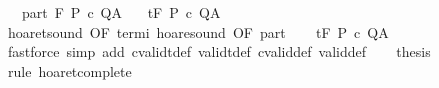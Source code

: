 \begin{isabellebody}
\ \ \ part{\isacharcolon}\ {\isachardoublequoteopen}{\isasymGamma}{\isacharcomma}{\isasymTheta}{\isasymturnstile}\isactrlbsub {\isacharslash}F\isactrlesub \ P\ c\ Q{\isacharcomma}A{\isachardoublequoteclose}\isanewline
\ \ \ {\isachardoublequoteopen}{\isasymGamma}{\isacharcomma}{\isasymTheta}{\isasymturnstile}\isactrlsub t\isactrlbsub {\isacharslash}F\isactrlesub \ P\ c\ Q{\isacharcomma}A{\isachardoublequoteclose}\isanewline
%
\isadelimproof
%
\endisadelimproof
%
\isatagproof
{}\isamarkupfalse%
\ {\isacharminus}\isanewline
\ \ \isamarkupfalse%
\ hoaret{\isacharunderscore}sound\ {\isacharbrackleft}OF\ termi{\isacharbrackright}\ hoare{\isacharunderscore}sound\ {\isacharbrackleft}OF\ part{\isacharbrackright}\isanewline
\ \ \isamarkupfalse%
\ {\isachardoublequoteopen}{\isasymGamma}{\isacharcomma}{\isasymTheta}{\isasymTurnstile}\isactrlsub t\isactrlbsub {\isacharslash}F\isactrlesub \ P\ c\ Q{\isacharcomma}A{\isachardoublequoteclose}\isanewline
\ \ \ \ \isamarkupfalse%
\ {\isacharparenleft}fastforce\ simp\ add{\isacharcolon}\ cvalidt{\isacharunderscore}def\ validt{\isacharunderscore}def\ cvalid{\isacharunderscore}def\ valid{\isacharunderscore}def{\isacharparenright}\isanewline
\ \ \isamarkupfalse%
\ {\isacharquery}thesis\isanewline
\ \ \ \ \isamarkupfalse%
\ {\isacharparenleft}rule\ hoaret{\isacharunderscore}complete{\isacharprime}{\isacharparenright}\isanewline
{}\isamarkupfalse%
%
\endisatagproof
{\isafoldproof}%
%
\isadelimproof
\isanewline
%
\endisadelimproof
%
\isadelimtheory
\ \isanewline
%
\endisadelimtheory
%
\isatagtheory
{}\isamarkupfalse%
%
\endisatagtheory
{\isafoldtheory}%
%
\isadelimtheory
%
\endisadelimtheory
%
\end{isabellebody}%
